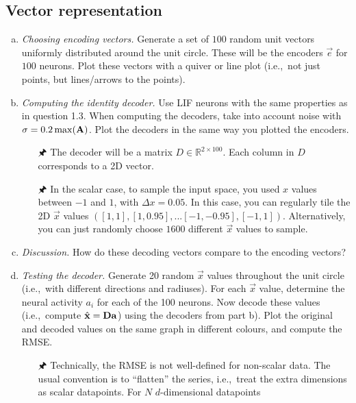 	\subsection{Vector representation}

	\begin{enumerate}[a)]
		\item {} \textit{Choosing encoding vectors.} Generate a set of $100$ random unit vectors uniformly distributed around the unit circle. These will be the encoders $\vec e$ for $100$ neurons. Plot these vectors with a quiver or line plot (i.e.,~not just points, but lines/arrows to the points).
		\item {} \textit{Computing the identity decoder.} Use LIF neurons with the same properties as in question 1.3. When computing the decoders, take into account noise with $\sigma = 0.2\max({\mathbf{A}})$. Plot the decoders in the same way you plotted the encoders.
		\begin{itemize}
			\item[{\symbolfont 🖈}] The decoder will be a matrix $D \in \mathbb{R}^{2 \times 100}$. Each column in $D$ corresponds to a 2D vector.
			\item[{\symbolfont 🖈}]
In the scalar case, to sample the input space, you used $x$ values between $-1$ and $1$, with $\Delta x=0.05$. In this case, you can regularly tile the 2D $\vec x$ values $([1, 1], [1, 0.95], ... [-1, -0.95], [-1, 1])$. Alternatively, you can just randomly choose $1600$ different $\vec x$ values to sample.
		\end{itemize}
		\item {} \textit{Discussion.} How do these decoding vectors compare to the encoding vectors?
		\item {} \textit{Testing the decoder.} Generate 20 random $\vec x$ values throughout the unit circle (i.e.,~with different directions and radiuses). For each $\vec x$ value, determine the neural activity $a_i$ for each of the 100 neurons. Now decode these values (i.e.,~compute $\hat{{\mathbf{x}}} = {\mathbf{D}} {\mathbf{a}}$) using the decoders from part b). Plot the original and decoded values on the same graph in different colours, and compute the RMSE.
		\begin{itemize}
			\item[{\symbolfont 🖈}] Technically, the RMSE is not well-defined for non-scalar data. The usual convention is to \enquote{flatten} the series, i.e.,~treat the extra dimensions as scalar datapoints. For $N$ $d$-dimensional datapoints
			\begin{align*}

\end{align*}
\end{itemize}
\end{enumerate}
